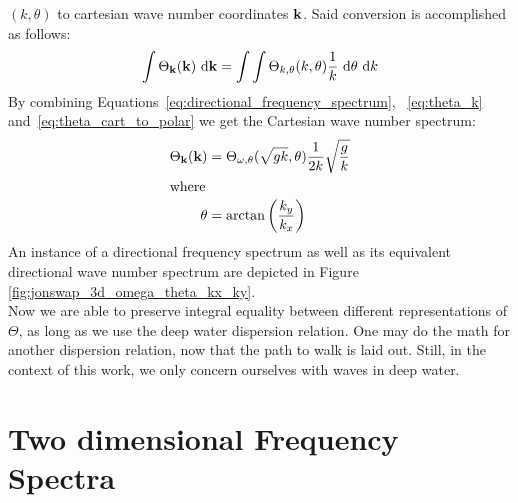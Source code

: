 $(k,\theta)$ to cartesian wave number coordinates $\mathbf{k}$. Said conversion 
is accomplished as follows:
%
\begin{equation}
\label{eq:theta_cart_to_polar}
\int\Theta_{\mathbf{k}}(\mathbf{k})~\mathrm{d}\mathbf{k} = 
\int\int\Theta_{k,\theta}(k,\theta)\frac{1}{k}~\mathrm{d}\theta~\mathrm{d}k
\end{equation}
%
By combining Equations~\ref{eq:directional_frequency_spectrum}, 
~\ref{eq:theta_k} and~\ref{eq:theta_cart_to_polar} we get the Cartesian wave 
number spectrum:
%
\begin{align}
\Theta_{\mathbf{k}}(\mathbf{k}) &= \Theta_{\omega,\theta}(\sqrt{gk}, 
\theta)\frac{1}{2k}\sqrt{\frac{g}{k}}\\
\intertext{where}
\theta &= \arctan\left(\frac{k_y}{k_x}\right)
\end{align}
%
An instance of a directional frequency spectrum as well as its equivalent
directional wave number spectrum are depicted in Figure
\ref{fig:jonswap_3d_omega_theta_kx_ky}.\\

Now we are able to preserve integral equality between different representations 
of $\Theta$, as long as we use the deep water dispersion relation. One may do 
the math for another dispersion relation, now that the path to walk is laid 
out. Still, in the context of this work, we only concern ourselves with waves 
in deep water.
%
\section{Two dimensional Frequency Spectra}

